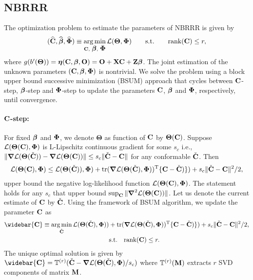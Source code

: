 \documentclass[12pt]{article}
\def\trans{^{\rm T}}
\newcommand{\bbL}{\mathcal{L}}
\DeclareMathOperator*{\argmin}{arg\,min}
\newcommand{\bs}{\boldsymbol}
\DeclareMathOperator{\Tr}{tr}
\begin{document}
\subsection{NBRRR}\label{sec:rcnbfar}
The optimization problem to estimate the parameters of   NBRRR is given by 
\begin{align}
(\widehat{\C}, \widehat{\bbeta}, \widehat{\bPhi}) \equiv \argmin_{\C,\,\, \bbeta, \,\, \bPhi}  \bbL(\bs\Theta, \bPhi)  \qquad \M{s.t.} \qquad \M{rank}(\C) \leq r, \label{eq:gsfar:obj1}
\end{align}
where $g(b'(\bs\Theta)) = \bs\eta(\C, \bbeta, \bO) = \bO + \X\C + \Z\bbeta$. %
The joint estimation of the unknown parameters $({\bf C}, \mbox{\boldmath $\beta$}, \mbox{\boldmath $\Phi$})$ is nontrivial. We solve the problem using a block upper bound  successive minimization (BSUM) approach \citep{razaviyayn2013unified} that cycles between ${\bf C}$-step, $\mbox{\boldmath $\beta$}$-step and $\mbox{\boldmath $\Phi$}$-step to update the parameters ${\bf C}$, $\mbox{\boldmath $\beta$}$ and $\mbox{\boldmath $\Phi$}$, respectively, until convergence.  

\paragraph{${\bf C}$-step:}\label{par:c}
For fixed  $\mbox{\boldmath $\beta$}$ and $\mbox{\boldmath $\Phi$}$, we denote $\bs\Theta$ as function of ${\bf C}$ by $\bs\Theta(\C)$.   Suppose $\bbL(\bs\Theta(\C), \bPhi)$ is L-Lipschitz continuous gradient for some $s_c$ i.e., $\|\bs\nabla \bbL(\bs\Theta(\check{\C}))  - \bs\nabla \bbL(\bs\Theta(\C))\| \leq s_c \| \check{\C} -\C\|$ for  any conformable $\check{{\bf C}}$.  Then
\begin{align*}
\bbL(\bs\Theta({\C}),\bPhi) \leq \bbL(\bs\Theta(\check{\C})),\bPhi)  +  \Tr( \bs\nabla \bbL(\bs\Theta(\check{\C}),\bPhi))\trans \{ \C - \check{\C})\} ) +s_c \|\check{\C} - \C\|^2/2,
\end{align*}
upper bound the negative log-likelihood function $\bbL(\bs\Theta({\C}),\bPhi)$. The statement holds for any $s_c$ that upper bound $\sup_{\C}\|\bs\nabla^2 \bbL(\bs\Theta({\C}))\|$. Let us denote the current estimate of ${\bf C}$ by $\check{{\bf C}}$. Using the framework of BSUM algorithm, we update the parameter ${\bf C}$ as 
\begin{align}
\widebar{\C} \equiv \argmin_{\check{\C}} \bbL(\bs\Theta(\check{\C}),\bPhi))  &+  \Tr( \bs\nabla \bbL(\bs\Theta(\check{\C}),\bPhi))\trans \{ \C - \check{\C})\} ) +s_c \|\check{\C} - \C\|^2/2, \notag \\ &\M{s.t.}\quad \M{rank}(\C) \leq r. 
\end{align}
The unique optimal solution is given by 
$\widebar{\C} =\mathbb{T}^{(r)} ( \check{\C} -  \bs\nabla \bbL(\bs\Theta(\check{\C}),\bPhi)/s_c) $ where  $\mathbb{T}^{(r)}(\mbox{\bf M})$ extracts  $r$ SVD components of matrix $\mbox{\bf M}$.
\end{document}
